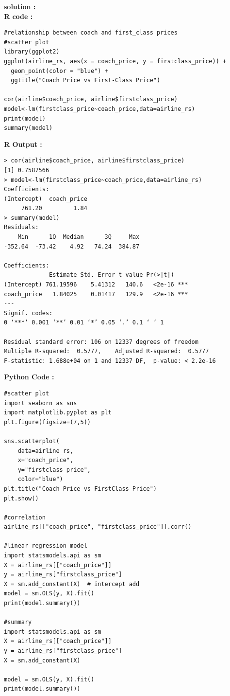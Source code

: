 \documentclass[11pt,a4paper]{article}
\begin{document}
\vspace{1em}
\noindent \textbf{solution :}\\
\noindent\textbf{R code :}
\begin{codebox}
\begin{lstlisting}[style=Rstyle]
#relationship between coach and first_class prices
#scatter plot
library(ggplot2)
ggplot(airline_rs, aes(x = coach_price, y = firstclass_price)) +
  geom_point(color = "blue") +
  ggtitle("Coach Price vs First-Class Price")

cor(airline$coach_price, airline$firstclass_price)
model<-lm(firstclass_price~coach_price,data=airline_rs)
print(model)
summary(model)

\end{lstlisting}
\end{codebox}
\vspace{0.5em}
\noindent \textbf{R Output :}
\begin{verbatim}
> cor(airline$coach_price, airline$firstclass_price)
[1] 0.7587566
> model<-lm(firstclass_price~coach_price,data=airline_rs)
Coefficients:
(Intercept)  coach_price  
     761.20         1.84  
> summary(model)
Residuals:
    Min      1Q  Median      3Q     Max 
-352.64  -73.42    4.92   74.24  384.87 

Coefficients:
             Estimate Std. Error t value Pr(>|t|)    
(Intercept) 761.19596    5.41312   140.6   <2e-16 ***
coach_price   1.84025    0.01417   129.9   <2e-16 ***
---
Signif. codes:  
0 ‘***’ 0.001 ‘**’ 0.01 ‘*’ 0.05 ‘.’ 0.1 ‘ ’ 1

Residual standard error: 106 on 12337 degrees of freedom
Multiple R-squared:  0.5777,	Adjusted R-squared:  0.5777 
F-statistic: 1.688e+04 on 1 and 12337 DF,  p-value: < 2.2e-16
\end{verbatim}
\vspace{0.5em}
\noindent \textbf{Python Code :}
\begin{codebox}
\begin{lstlisting}[style=Pythonstyle]
#scatter plot
import seaborn as sns
import matplotlib.pyplot as plt
plt.figure(figsize=(7,5))

sns.scatterplot(
    data=airline_rs,
    x="coach_price",
    y="firstclass_price",
    color="blue")
plt.title("Coach Price vs FirstClass Price")
plt.show()

#correlation
airline_rs[["coach_price", "firstclass_price"]].corr()

#linear regression model
import statsmodels.api as sm
X = airline_rs[["coach_price"]]
y = airline_rs["firstclass_price"]
X = sm.add_constant(X)  # intercept add
model = sm.OLS(y, X).fit()
print(model.summary())

#summary
import statsmodels.api as sm
X = airline_rs[["coach_price"]]
y = airline_rs["firstclass_price"]
X = sm.add_constant(X)

model = sm.OLS(y, X).fit()
print(model.summary())
\end{lstlisting}
\end{codebox}
\end{document}
